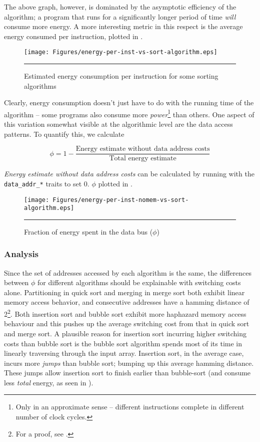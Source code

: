 The above graph, however, is dominated by the asymptotic efficiency of
the algorithm; a program that runs for a significantly longer period
of time \textit{will} consume more energy.  A more interesting metric
in this respect is the average energy consumed per instruction,
plotted in .

\begin{figure}[htbp]
  \centering
  \texttt{[image: Figures/energy-per-inst-vs-sort-algorithm.eps]}
  \rule{35em}{0.5pt}
  \caption{Estimated energy consumption per instruction for some sorting algorithms}
  \label{fig:energy-per-inst-sort-algo}
\end{figure}

Clearly, energy consumption doesn't just have to do with the running
time of the algorithm -- some programs also consume more
\textit{power}\footnote{Only in an approximate sense -- different
  instructions complete in different number of clock cycles.} than
others.  One aspect of this variation somewhat visible at the
algorithmic level are the data access patterns.  To quantify this, we
calculate

\begin{equation}
\phi = 1 - \frac{\text{Energy estimate without data address
    costs}}{\text{Total energy estimate}}
\end{equation}

\textit{Energy estimate without data address costs} can be calculated
by running \wattage with the \texttt{data\_addr\_*} traits to set 0.
$\phi$ plotted in .

\begin{figure}[htbp]
  \centering
  \texttt{[image: Figures/energy-per-inst-nomem-vs-sort-algorithm.eps]}
  \rule{35em}{0.5pt}
  \caption{Fraction of energy spent in the data bus ($\phi$)}
  \label{fig:energy-per-inst-nomem-sort-algo}
\end{figure}

\subsubsection{Analysis}

Since the set of addresses accessed by each algorithm is the same, the
differences between $\phi$ for different algorithms should be
explainable with switching costs alone.  Partitioning in quick sort
and merging in merge sort both exhibit linear memory access behavior,
and consecutive addresses have a hamming distance of 2\footnote{For a
  proof, see .}.  Both insertion sort
and bubble sort exhibit more haphazard memory access behaviour and
this pushes up the average switching cost from that in quick sort and
merge sort.  A plausible reason for insertion sort incurring higher
switching costs than bubble sort is the bubble sort algorithm spends
most of its time in linearly traversing through the input array.
Insertion sort, in the average case, incurs more \textit{jumps} than
bubble sort; bumping up this average hamming distance.  These jumps
allow insertion sort to finish earlier than bubble-sort (and consume
less \textit{total} energy, as seen in
).

